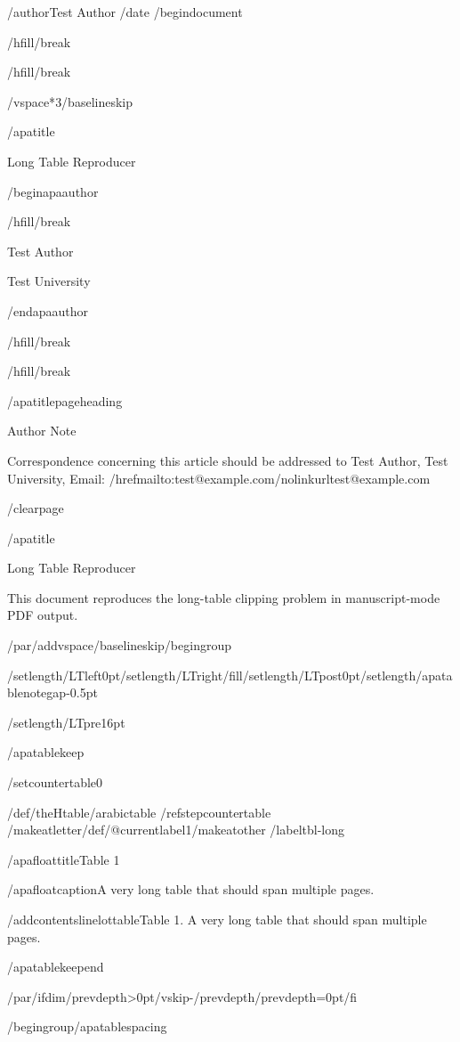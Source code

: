 /author{Test Author}
/date{}
/begin{document}


/hfill/break

/hfill/break

/vspace*{3/baselineskip}

/apatitle{

Long Table Reproducer

}

/begin{apaauthor}

/hfill/break

Test Author

Test University

/end{apaauthor}

/hfill/break

/hfill/break

/apatitlepageheading{

Author Note

}

Correspondence concerning this article should be addressed to Test
Author, Test University, Email:
/href{mailto:test@example.com}{/nolinkurl{test@example.com}}

/clearpage

/apatitle{

Long Table Reproducer

}

This document reproduces the long-table clipping problem in
manuscript-mode PDF output.

/par/addvspace{/baselineskip}/begingroup

/setlength{/LTleft}{0pt}/setlength{/LTright}{/fill}/setlength{/LTpost}{0pt}/setlength{/apatablenotegap}{-0.5pt}

/setlength{/LTpre}{16pt}

/apatablekeep

/setcounter{table}{0}

/def/theHtable{/arabic{table}}%
/refstepcounter{table}%
/makeatletter/def/@currentlabel{1}/makeatother%
/label{tbl-long}

/apafloattitle{Table 1}

/apafloatcaption{A very long table that should span multiple pages.}

/addcontentsline{lot}{table}{Table 1. A very long table that should span
multiple pages.}

/apatablekeepend

/par/ifdim/prevdepth>0pt/vskip-/prevdepth/prevdepth=0pt/fi

/begingroup/apatablespacing

